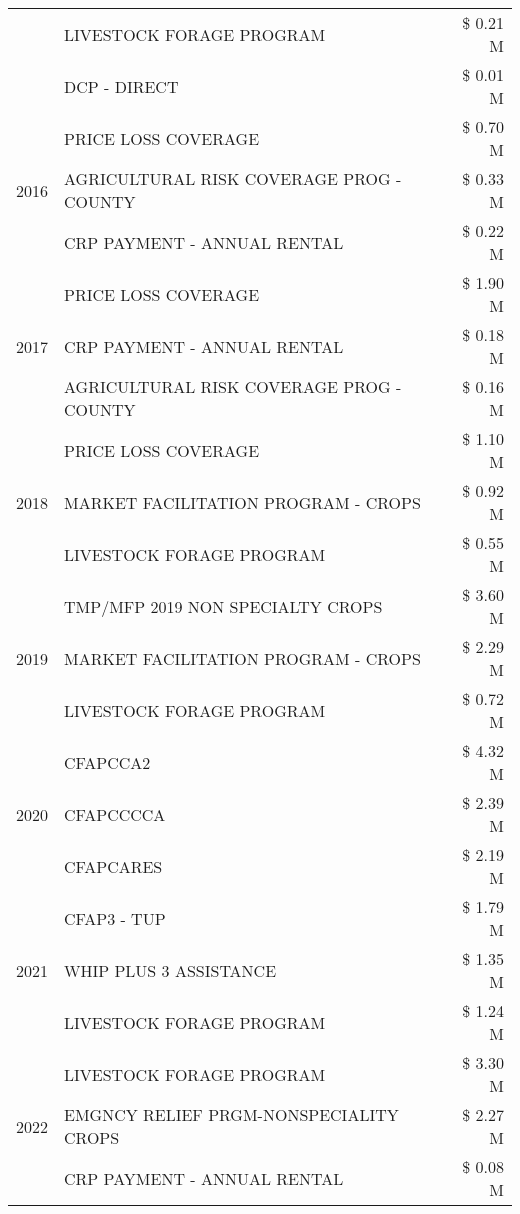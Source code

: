 \begin{tabular}{llr}
 & LIVESTOCK FORAGE PROGRAM & \$ 0.21 M \\
 & DCP - DIRECT & \$ 0.01 M \\
\cline{1-3}
\multirow[t]{3}{*}{2016} & PRICE LOSS COVERAGE & \$ 0.70 M \\
 & AGRICULTURAL RISK COVERAGE PROG - COUNTY & \$ 0.33 M \\
 & CRP PAYMENT - ANNUAL RENTAL & \$ 0.22 M \\
\cline{1-3}
\multirow[t]{3}{*}{2017} & PRICE LOSS COVERAGE & \$ 1.90 M \\
 & CRP PAYMENT - ANNUAL RENTAL & \$ 0.18 M \\
 & AGRICULTURAL RISK COVERAGE PROG - COUNTY & \$ 0.16 M \\
\cline{1-3}
\multirow[t]{3}{*}{2018} & PRICE LOSS COVERAGE & \$ 1.10 M \\
 & MARKET FACILITATION PROGRAM - CROPS & \$ 0.92 M \\
 & LIVESTOCK FORAGE PROGRAM & \$ 0.55 M \\
\cline{1-3}
\multirow[t]{3}{*}{2019} & TMP/MFP 2019 NON SPECIALTY CROPS & \$ 3.60 M \\
 & MARKET FACILITATION PROGRAM - CROPS & \$ 2.29 M \\
 & LIVESTOCK FORAGE PROGRAM & \$ 0.72 M \\
\cline{1-3}
\multirow[t]{3}{*}{2020} & CFAPCCA2 & \$ 4.32 M \\
 & CFAPCCCCA & \$ 2.39 M \\
 & CFAPCARES & \$ 2.19 M \\
\cline{1-3}
\multirow[t]{3}{*}{2021} & CFAP3 - TUP & \$ 1.79 M \\
 & WHIP PLUS 3 ASSISTANCE & \$ 1.35 M \\
 & LIVESTOCK FORAGE PROGRAM & \$ 1.24 M \\
\cline{1-3}
\multirow[t]{3}{*}{2022} & LIVESTOCK FORAGE PROGRAM & \$ 3.30 M \\
 & EMGNCY RELIEF PRGM-NONSPECIALITY CROPS & \$ 2.27 M \\
 & CRP PAYMENT - ANNUAL RENTAL & \$ 0.08 M \\
\cline{1-3}
\bottomrule
\end{tabular}
